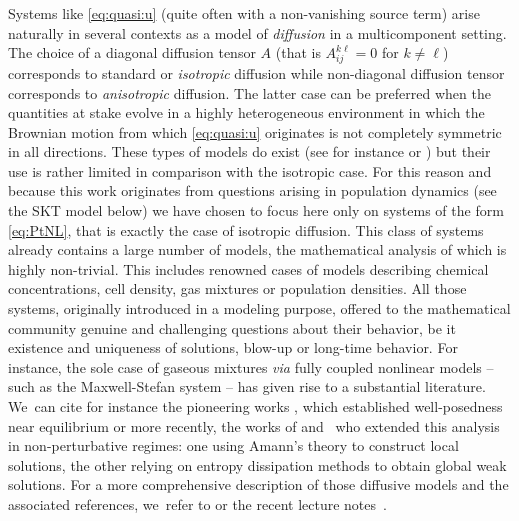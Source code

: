 \documentclass[JEP,XML,SOM,Unicode,published]{cedram}
\theoremstyle{definition}
\begin{document}
Systems like \eqref{eq:quasi:u} (quite often with a non-vanishing source term) arise naturally in several contexts as a model of \emph{diffusion} in a multicomponent setting. The choice of a diagonal diffusion tensor $A$ (that is $A_{ij}^{k\ell} = 0$ for $k\neq \ell$) corresponds to standard or \emph{isotropic} diffusion while non-diagonal diffusion tensor corresponds to \emph{anisotropic} diffusion. The latter case can be preferred when the quantities at stake evolve in a highly heterogeneous environment in which the Brownian motion from which \eqref{eq:quasi:u} originates is not completely symmetric in all directions. These types of models do exist (see for instance \cite{chen_perthame} or \cite{hillen}) but their use is rather limited in comparison with the isotropic case. For this reason and because this work originates from questions arising in population dynamics (see the SKT model below) we have chosen to focus here only on systems of the form \eqref{eq:PtNL}, that is exactly the case of isotropic diffusion. This class of systems already contains a large number of models, the mathematical analysis of which is highly non-trivial. {This includes renowned cases of models describing chemical concentrations, cell density, gas mixtures or population densities. All those systems, originally introduced in a modeling purpose, offered to the mathematical community genuine and challenging questions about their behavior, be it existence and uniqueness of solutions, blow-up or long-time behavior. For instance, the sole case of gaseous mixtures \emph{via} fully coupled nonlinear models -- such as the Maxwell-Stefan system -- has given rise to a substantial literature. We~can cite for instance the pioneering works \cite{gio,giomassot}, which established well-posedness near equilibrium or more recently, the works of \cite{bothe} and~\cite{jungstel} who extended this analysis in non-perturbative regimes: one using Amann's theory to construct local solutions, the other relying on entropy dissipation methods to obtain global weak solutions. For a more comprehensive description of those diffusive models and the associated references, we~refer to \cite[Chap.\,4]{ansgar} or the recent lecture notes~\cite{jung_lecture_notes}.}
\end{document}
